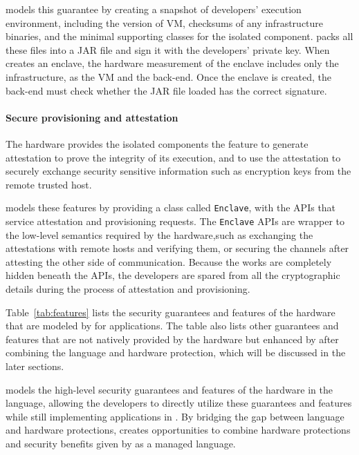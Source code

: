 \sysname{} models this guarantee by creating a snapshot of developers'
execution environment, including the version of \java{} VM,
checksums of any infrastructure binaries,
and the minimal supporting classes for the isolated component. 
\sysname{} packs all these files into a JAR file and sign it with the developers' private key.
When \sysname{} creates an enclave, the hardware measurement of the enclave includes only the infrastructure, as the \java{} VM and the \sysname{} back-end.
Once the enclave is created, the \sysname{} back-end must  
check whether the JAR file loaded has the correct signature.

\paragraph{Secure provisioning and attestation}
The \sgx{} hardware provides the isolated components the feature to generate attestation to prove the integrity of its execution,
and to use the attestation to securely exchange
security sensitive information such as encryption keys from the remote trusted host.

\sysname{} models these features by providing a class called {\tt Enclave}, with the APIs that service attestation and provisioning requests.
The {\tt Enclave} APIs are wrapper to the low-level semantics required by the \sgx{} hardware,such as exchanging the attestations with remote hosts and verifying them, or 
securing the channels after attesting the other side of communication.
Because the works are completely hidden beneath the APIs,
the developers are spared from all the cryptographic details during the process of attestation and provisioning.

\vspace{0.15in}
Table~\ref{tab:features} lists the security guarantees and features of
the \sgx{} hardware
that are modeled by \sysname{} for \java{} applications.
The table also lists other guarantees and features
that are not natively provided by the \sgx{} hardware
but enhanced by \sysname{} after combining the language and hardware protection, which will be discussed in the later sections.  


\sysname{} models the high-level security guarantees and features
of the \sgx{} hardware in the \java{} language,
allowing the developers to directly utilize these guarantees and features
while still implementing applications in \java{}.
By bridging the gap between language and hardware protections,
\sysname{} creates opportunities to combine \sgx{} hardware protections
and security benefits given by \java{} as a managed language.

